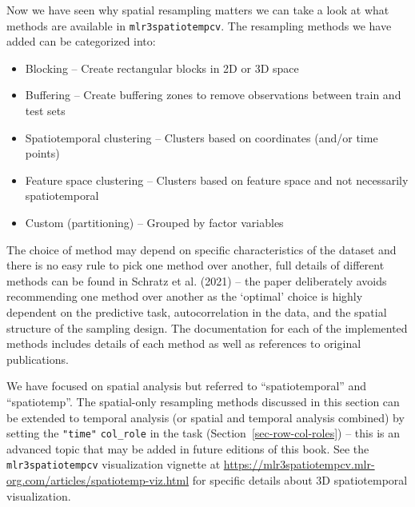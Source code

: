 Now we have seen why spatial resampling matters we can take a look at
what methods are available in \texttt{mlr3spatiotempcv}. The resampling
methods we have added can be categorized into:

\begin{itemize}
\tightlist
\item
  Blocking -- Create rectangular blocks in 2D or 3D space
\item
  Buffering -- Create buffering zones to remove observations between
  train and test sets
\item
  Spatiotemporal clustering -- Clusters based on coordinates (and/or
  time points)
\item
  Feature space clustering -- Clusters based on feature space and not
  necessarily spatiotemporal
\item
  Custom (partitioning) -- Grouped by factor variables
\end{itemize}

The choice of method may depend on specific characteristics of the
dataset and there is no easy rule to pick one method over another, full
details of different methods can be found in Schratz et al. (2021) --
the paper deliberately avoids recommending one method over another as
the `optimal' choice is highly dependent on the predictive task,
autocorrelation in the data, and the spatial structure of the sampling
design. The documentation for each of the implemented methods includes
details of each method as well as references to original publications.

\begin{tcolorbox}[enhanced jigsaw, opacitybacktitle=0.6, rightrule=.15mm, opacityback=0, arc=.35mm, breakable, titlerule=0mm, colframe=quarto-callout-tip-color-frame, coltitle=black, bottomrule=.15mm, toprule=.15mm, colback=white, colbacktitle=quarto-callout-tip-color!10!white, bottomtitle=1mm, toptitle=1mm, title=\textcolor{quarto-callout-tip-color}{\faLightbulb}\hspace{0.5em}{Spatio\emph{temporal} Resampling}, leftrule=.75mm, left=2mm]

We have focused on spatial analysis but referred to ``spatiotemporal''
and ``spatiotemp''. The spatial-only resampling methods discussed in
this section can be extended to temporal analysis (or spatial and
temporal analysis combined) by setting the \texttt{"time"}
\texttt{col\_role} in the task (Section~\ref{sec-row-col-roles}) -- this
is an advanced topic that may be added in future editions of this book.
See the \texttt{mlr3spatiotempcv} visualization vignette at
\url{https://mlr3spatiotempcv.mlr-org.com/articles/spatiotemp-viz.html}
for specific details about 3D spatiotemporal visualization.

\end{tcolorbox}

